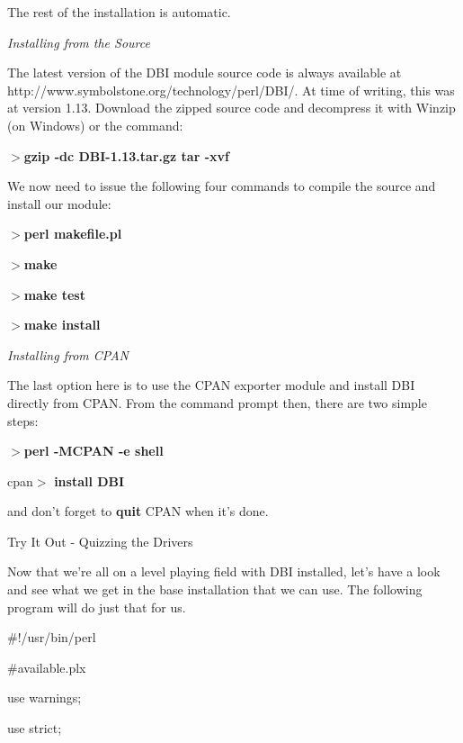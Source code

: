 \documentclass[a4paper,11pt]{book}
\begin{document}
\noindent The rest of the installation is automatic.

\noindent 

\noindent \textit{Installing from the Source}

\noindent The latest version of the DBI module source code is always available at http://www.symbolstone.org/technology/perl/DBI/. At time of writing, this was at version 1.13. Download the zipped source code and decompress it with Winzip (on Windows) or the command:

\noindent 

\noindent $>$\textbf{gzip -dc DBI-1.13.tar.gz \textbar  tar -xvf}

\noindent 

\noindent We now need to issue the following four commands to compile the source and install our module:

\noindent 

\noindent $>$\textbf{perl makefile.pl}

\noindent $>$\textbf{make}

\noindent $>$\textbf{make test}

\noindent $>$\textbf{make install}

\noindent 

\noindent \textit{Installing from CPAN}

\noindent The last option here is to use the CPAN exporter module and install DBI directly from CPAN. From the command prompt then, there are two simple steps:

\noindent 

\noindent $>$\textbf{perl -MCPAN -e shell}

\noindent cpan$>$ \textbf{install DBI}

\noindent 

\noindent and don't forget to \textbf{quit }CPAN when it's done.

\noindent 

\noindent Try It Out - Quizzing the Drivers

\noindent Now that we're all on a level playing field with DBI installed, let's have a look and see what we get in the base installation that we can use. The following program will do just that for us.

\noindent 

\noindent \#!/usr/bin/perl

\noindent \#available.plx

\noindent use warnings;

\noindent use strict;
\end{document}
